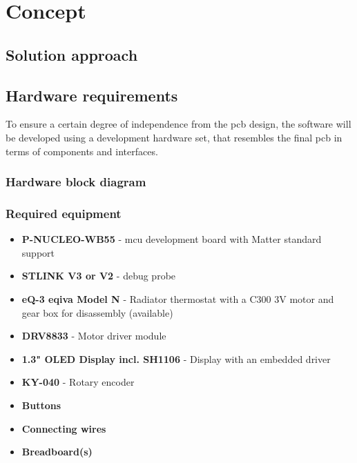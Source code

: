 %
%

\chapter{Concept}
\label{chap:Concept}

\section{Solution approach}
\label{sec:Solution approach}


\section{Hardware requirements}
\label{sec:Hardware requirements}

To ensure a certain degree of independence from the \acs{pcb} design, the software will be developed using a development hardware set, that resembles the final \acs{pcb} in terms of components and interfaces.

\subsection{Hardware block diagram}
\label{sec:Hardware block diagram}

\subsection{Required equipment}
\label{sec:Required equipment}

\begin{itemize}
    \item \textbf{P-NUCLEO-WB55} - \acs{mcu} development board with Matter standard support
    \item \textbf{STLINK V3 or V2} - debug probe
    \item \textbf{eQ-3 eqiva Model N} - Radiator thermostat with a C300 3V motor and gear box for disassembly (available)
    \item \textbf{DRV8833} - Motor driver module
    \item \textbf{1.3" OLED Display incl. SH1106} - Display with an embedded driver
    \item \textbf{KY-040} - Rotary encoder
    \item \textbf{Buttons}
    \item \textbf{Connecting wires}
    \item \textbf{Breadboard(s)}
\end{itemize}
